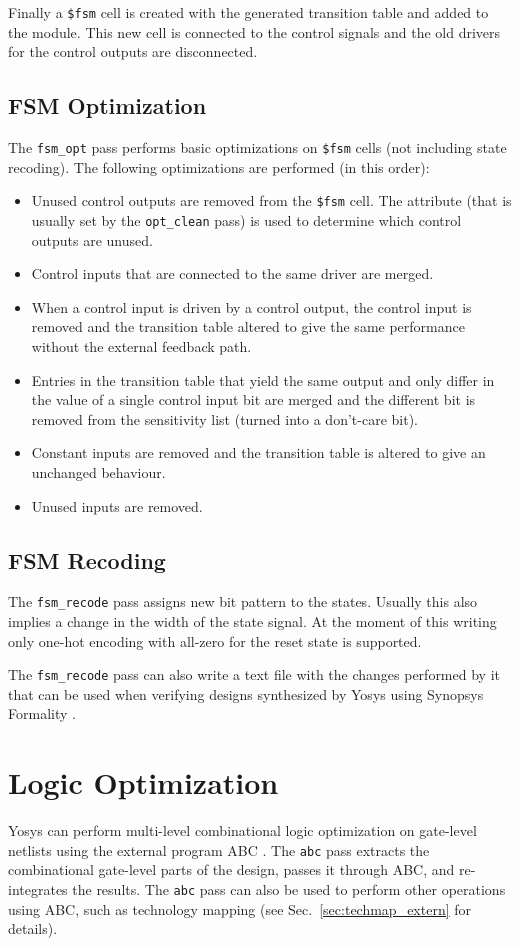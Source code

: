 Finally a {\tt \$fsm} cell is created with the generated transition table and added to the
module. This new cell is connected to the control signals and the old drivers for the
control outputs are disconnected.

\subsection{FSM Optimization}

The {\tt fsm\_opt} pass performs basic optimizations on {\tt \$fsm} cells (not including state
recoding). The following optimizations are performed (in this order):

\begin{itemize}
\item Unused control outputs are removed from the {\tt \$fsm} cell. The attribute 
(that is usually set by the {\tt opt\_clean} pass) is used to determine which control
outputs are unused.
\item Control inputs that are connected to the same driver are merged.
\item When a control input is driven by a control output, the control input is removed and the transition
table altered to give the same performance without the external feedback path.
\item Entries in the transition table that yield the same output and only
differ in the value of a single control input bit are merged and the different bit is removed
from the sensitivity list (turned into a don't-care bit).
\item Constant inputs are removed and the transition table is altered to give an unchanged behaviour.
\item Unused inputs are removed.
\end{itemize}

\subsection{FSM Recoding}

The {\tt fsm\_recode} pass assigns new bit pattern to the states. Usually this
also implies a change in the width of the state signal. At the moment of this
writing only one-hot encoding with all-zero for the reset state is supported.

The {\tt fsm\_recode} pass can also write a text file with the changes performed
by it that can be used when verifying designs synthesized by Yosys using Synopsys
Formality .

\section{Logic Optimization}

Yosys can perform multi-level combinational logic optimization on gate-level netlists using the
external program ABC . The {\tt abc} pass extracts the combinational gate-level
parts of the design, passes it through ABC, and re-integrates the results. The {\tt abc} pass
can also be used to perform other operations using ABC, such as technology mapping (see
Sec.~\ref{sec:techmap_extern} for details).


